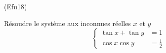 \begin{tiny}(Efu18)\end{tiny} Résoudre le système aux inconnues réelles $x$ et $y$
\begin{displaymath}
 \left\lbrace 
\begin{aligned}
 \tan x + \tan y &= 1\\ \cos x \cos y &= \frac{1}{2}
\end{aligned}
\right. 
\end{displaymath}
 